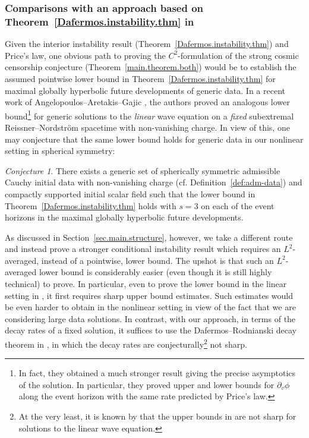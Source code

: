 \documentclass[10pt, reqno]{amsart}
\theoremstyle{definition}
\theoremstyle{remark}
\newtheorem{conjecture}[theorem]{Conjecture}
\numberwithin{equation}{section}
\newcommand{\rd}{\partial}
\newcommand{\0}{\emptyset}
\begin{document}
\subsubsection{Comparisons with an approach based on Theorem~\ref{Dafermos.instability.thm} in \cite{D2}} \label{sec.comparison}
Given the interior instability result (Theorem~\ref{Dafermos.instability.thm}) and Price's law, one obvious path to proving the $C^{2}$-formulation of the strong cosmic censorship conjecture (Theorem~\ref{main.theorem.both}) would be to establish the assumed pointwise lower bound in Theorem~\ref{Dafermos.instability.thm} for maximal globally hyperbolic future developments of generic data. In a recent work of Angelopoulos--Aretakis--Gajic \cite{AAG}, the authors proved an analogous lower bound\footnote{In fact, they obtained a much stronger result giving the precise asymptotics of the solution. In particular, they proved upper and lower bounds for $\rd_v\phi$ along the event horizon with the same rate predicted by Price's law.} for generic solutions to the \emph{linear} wave equation on a \emph{fixed} subextremal Reissner--Nordstr\"om spacetime with non-vanishing charge. 
In view of this, one may conjecture that the same lower bound holds for generic data in our nonlinear setting in spherical symmetry:


\begin{conjecture}
There exists a generic set of spherically symmetric admissible Cauchy initial data with non-vanishing charge (cf. Definition~\ref{def:adm-data}) and compactly supported initial scalar field such that the lower bound in Theorem~\ref{Dafermos.instability.thm} holds with $s=3$ on each of the event horizons in the maximal globally hyperbolic future developments.
\end{conjecture}


As discussed in Section~\ref{sec.main.structure}, however, we take a different route and instead prove a stronger conditional instability result which requires an $L^2$-averaged, instead of a pointwise, lower bound. The upshot is that such an $L^2$-averaged lower bound is considerably easier (even though it is still highly technical) to prove. In particular, even to prove the lower bound in the linear setting in \cite{AAG}, it first requires sharp upper bound estimates. Such estimates would be even harder to obtain in the nonlinear setting in view of the fact that we are considering large data solutions. In contrast, with our approach, in terms of the decay rates of a fixed solution, it suffices to use the Dafermos--Rodnianski decay theorem in \cite{DRPL}, in which the decay rates are conjecturally\footnote{At the very least, it is known by \cite{AAG} that the upper bounds in \cite{DRPL} are not sharp for solutions to the linear wave equation.} not sharp.   
\end{document}
